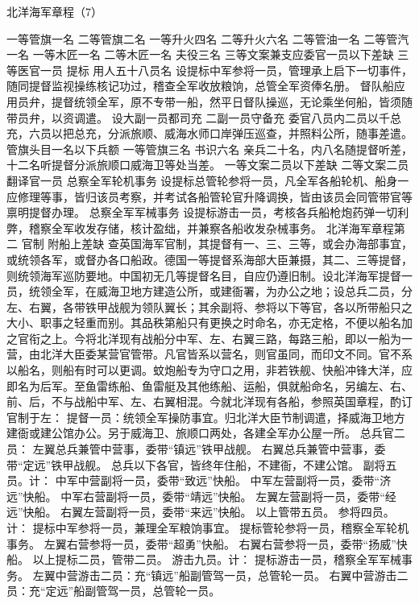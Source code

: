 \documentclass[12pt,UTF8]{ctexbook}
\begin{document}
北洋海军章程（7）

一等管旗一名
二等管旗二名
一等升火四名
二等升火六名
二等管油一名
二等管汽一名
一等木匠一名
二等木匠一名
夫役三名
三等文案兼支应委官一员以下差缺
三等医官一员
提标
用人五十八员名
设提标中军参将一员，管理承上启下一切事件，随同提督监视操练核记功过，稽查全军收放粮饷，总管全军资俸名册。
督队船应用员弁，提督统领全军，原不专带一船，然平日督队操巡，无论乘坐何船，皆须随带员弁，以资调遣。
设大副一员都司充
二副一员守备充
委官八员内二员以千总充，六员以把总充，分派旅顺、威海水师口岸弹压巡查，并照料公所，随事差遣。
管旗头目一名以下兵额
一等管旗三名
书识六名
亲兵二十名，内八名随提督听差，十二名听提督分派旅顺口威海卫等处当差。
一等文案二员以下差缺
二等文案二员
翻译官一员
总察全军轮机事务
设提标总管轮参将一员，凡全军各船轮机、船身一应修理等事，皆归该员考察，并考试各船管轮官升降调换，皆由该员会同管带官等禀明提督办理。
总察全军军械事务
设提标游击一员，考核各兵船枪炮药弹一切利弊，稽察全军收发存储，核计盈绌，并兼察各船收发杂械事务。
北洋海军章程第二
官制 附船上差缺
查英国海军官制，其提督有一、三、三等，或会办海部事宜，或统领各军，或督办各口船政。德国一等提督系海部大臣兼摄，其二、三等提督，则统领海军巡防要地。中国初无几等提督名目，自应仍遵旧制。设北洋海军提督一员，统领全军，在威海卫地方建造公所，或建衙署，为办公之地；设总兵二员，分左、右翼，各带铁甲战舰为领队翼长；其余副将、参将以下等官，各以所带船只之大小、职事之轻重而别。其品秩第船只有更换之时命名，亦无定格，不便以船名加之官衔之上。今将北洋现有战船分中军、左、右翼三路，每路三船，即以一船为一营，由北洋大臣委某营官管带。凡官皆系以营名，则官虽同，而印文不同。官不系以船名，则船有时可以更调。蚊炮船专为守口之用，非若铁舰、快船冲锋大洋，应即名为后军。至鱼雷练船、鱼雷艇及其他练船、运船，俱就船命名，另编左、右、前、后，不与战船中军、左、右翼相混。今就北洋现有各船，参照英国章程，酌订官制于左：
提督一员：统领全军操防事宜。归北洋大臣节制调遣，择威海卫地方建衙或建公馆办公。另于威海卫、旅顺口两处，各建全军办公屋一所。
总兵官二员：
左翼总兵兼管中营事，委带“镇远”铁甲战舰。
右翼总兵兼管中营事，委带“定远”铁甲战舰。
总兵以下各官，皆终年住船，不建衙，不建公馆。
副将五员。计：
中军中营副将一员，委带“致远”快船。
中军左营副将一员，委带“济远”快船。
中军右营副将一员，委带“靖远”快船。
左翼左营副将一员，委带“经远”快船。
右翼左营副将一员，委带“来远”快船。
以上管带五员。
参将四员。计：
提标中军参将一员，兼理全军粮饷事宜。
提标管轮参将一员，稽察全军轮机事务。
左翼右营参将一员，委带“超勇”快船。
右翼右营参将一员，委带“扬威”快船。
以上提标二员，管带二员。
游击九员。计：
提标游击一员，稽察全军军械事务。
左翼中营游击二员：充“镇远”船副管驾一员，总管轮一员。
右翼中营游击二员：充“定远”船副管驾一员，总管轮一员。
\end{document}
